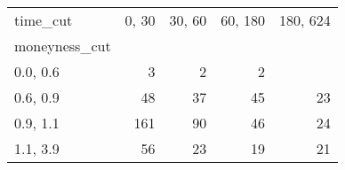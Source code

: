 \begin{tabular}{lrrrr}
\toprule
time\_cut &  0, 30 &  30, 60 &  60, 180 &  180, 624 \\
moneyness\_cut &          &           &            &             \\
\midrule
0.0, 0.6    &        3 &         2 &          2 &             \\
0.6, 0.9    &       48 &        37 &         45 &          23 \\
0.9, 1.1    &      161 &        90 &         46 &          24 \\
1.1, 3.9    &       56 &        23 &         19 &          21 \\
\bottomrule
\end{tabular}
